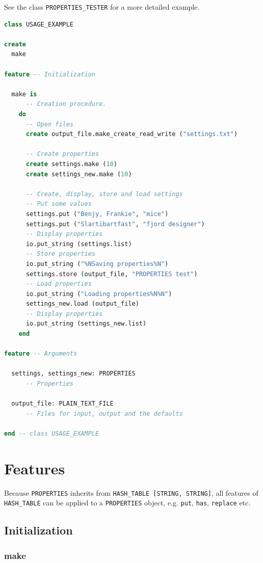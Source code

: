 \documentclass[a4paper,fleqn]{report}
\begin{document}
See the class \texttt{PROPERTIES\_TESTER} for a more detailed example.

\begin{lstlisting}[language=Eiffel]
class USAGE_EXAMPLE

create 
  make

feature -- Initialization

  make is
      -- Creation procedure.
    do                  
      -- Open files
      create output_file.make_create_read_write ("settings.txt")
                        
      -- Create properties
      create settings.make (10)
      create settings_new.make (10)
                        
      -- Create, display, store and load settings
      -- Put some values
      settings.put ("Benjy, Frankie", "mice")
      settings.put ("Slartibartfast", "fjord designer")
      -- Display properties
      io.put_string (settings.list)
      -- Store properties
      io.put_string ("%NSaving properties%N")
      settings.store (output_file, "PROPERTIES test")
      -- Load properties
      io.put_string ("Loading properties%N%N")
      settings_new.load (output_file)
      -- Display properties
      io.put_string (settings_new.list)
    end
                
feature -- Arguments

  settings, settings_new: PROPERTIES
      -- Properties
                        
  output_file: PLAIN_TEXT_FILE
      -- Files for input, output and the defaults
        
end -- class USAGE_EXAMPLE
\end{lstlisting}


\chapter{Features}
\label{cha:features}

Because \texttt{PROPERTIES} inherits from \texttt{HASH\_TABLE [STRING,
  STRING]}, all features of \texttt{HASH\_TABLE} can be applied to a
\texttt{PROPERTIES} object, e.g. \texttt{put}, \texttt{has},
\texttt{replace} etc.

\section{Initialization}
\label{sec:initialization}


\subsection{make}
\label{sec:make}
\end{document}
